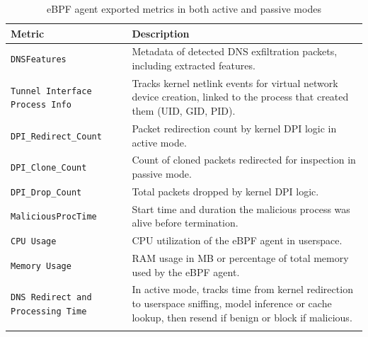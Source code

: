 \documentclass [11pt, proquest] {uwthesis}[2020/02/24]
\begin{document}
\begin{longtable}{|p{4cm}|p{10cm}|}
\hline
\textbf{Metric} & \textbf{Description} \\
\hline
\texttt{DNSFeatures} & Metadata of detected DNS exfiltration packets, including extracted features. \\
\hline
\texttt{Tunnel Interface Process Info} & Tracks kernel netlink events for virtual network device creation, linked to the process that created them (UID, GID, PID). \\
\hline
\texttt{DPI\_Redirect\_Count} & Packet redirection count by kernel DPI logic in active mode. \\
\hline
\texttt{DPI\_Clone\_Count} & Count of cloned packets redirected for inspection in passive mode. \\
\hline
\texttt{DPI\_Drop\_Count} & Total packets dropped by kernel DPI logic. \\
\hline
\texttt{MaliciousProcTime} & Start time and duration the malicious process was alive before termination. \\
\hline
\texttt{CPU Usage} & CPU utilization of the eBPF agent in userspace. \\
\hline
\texttt{Memory Usage} & RAM usage in MB or percentage of total memory used by the eBPF agent. \\
\hline
\texttt{DNS Redirect and Processing Time} & In active mode, tracks time from kernel redirection to userspace sniffing, model inference or cache lookup, then resend if benign or block if malicious. \\
\hline
\caption{eBPF agent exported metrics in both active and passive modes}
\label{sec:dp_ebpf_node_metrics}
\end{longtable}
\end{document}
